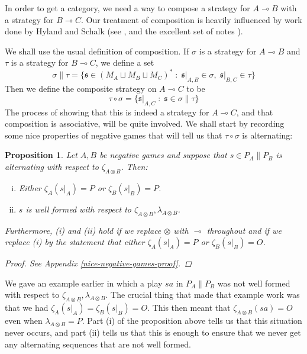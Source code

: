 \documentclass[11pt]{article} %
\theoremstyle{plain} %
\newtheorem{proposition}[theorem]{Proposition}
\theoremstyle{definition} %
\theoremstyle{note}
\theoremstyle{exercisestyle}
\newcommand{\tensor}{\otimes}
\renewcommand{\implies}{\multimap}
\newcommand{\comp}[2]{#1 \circ #2}
\newcommand{\cprd}{\sqcup}
\newcommand{\suchthat}{\;\colon\;}
\newcommand{\s}{\mathfrak s}
\begin{document}
In order to get a category, we need a way to compose a strategy for $A\implies B$ with a strategy for $B\implies C$.  Our treatment of composition is heavily influenced by work done by Hyland and Schalk (see \cite{hyland1997games}, \cite{hylandschalkgames} and the excellent set of notes \cite{Schalk2001GsNotes}).  

We shall use the usual definition of composition.  If $\sigma$ is a strategy for $A\implies B$ and $\tau$ is a strategy for $B\implies C$, we define a set
\[
  \sigma\|\tau = \{\s\in (M_A \cprd M_B \cprd M_C)^*\suchthat \s\vert_{A,B}\in\sigma,\;\s\vert_{B,C}\in\tau\}
  \]
Then we define the composite strategy on $A\implies C$ to be
\[
  \comp\tau\sigma = \{\s\vert_{A,C}\suchthat\s\in\sigma\|\tau\}
  \]
The process of showing that this is indeed a strategy for $A\implies C$, and that composition is associative, will be quite involved.  We shall start by recording some nice properties of negative games that will tell us that $\comp\tau\sigma$ is alternating:

\begin{proposition}
  Let $A,B$ be negative games and suppose that $s\in P_A\|P_B$ is alternating with respect to $\zeta_{A\tensor B}$.  Then:
  \begin{enumerate}[i)]
    \item Either $\zeta_{A}(s\vert_A)=P$ or $\zeta_{B}(s\vert_B)=P$.  
    \item $s$ is well formed with respect to $\zeta_{A\tensor B},\lambda_{A\tensor B}$.  
  \end{enumerate}
  Furthermore, (i) and (ii) hold if we replace $\tensor$ with $\implies$ throughout and if we replace (i) by the statement that either $\zeta_A(s\vert_A)=P$ or $\zeta_B(s\vert_B)=O$.
  \begin{proof}
    See Appendix \ref{nice-negative-games-proof}.
  \end{proof}
  \label{nice-negative-games}
\end{proposition}

We gave an example earlier in which a play $sa$ in $P_A\|P_B$ was not well formed with respect to $\zeta_{A\tensor B},\lambda_{A\tensor B}$.  The crucial thing that made that example work was that we had $\zeta_A(s\vert_A)=\zeta_B(s\vert_B)=O$.  This then meant that $\zeta_{A\tensor B}(sa)=O$ even when $\lambda_{A\tensor B}=P$.  Part (i) of the proposition above tells us that this situation never occurs, and part (ii) tells us that this is enough to ensure that we never get any alternating sequences that are not well formed.
\end{document}
